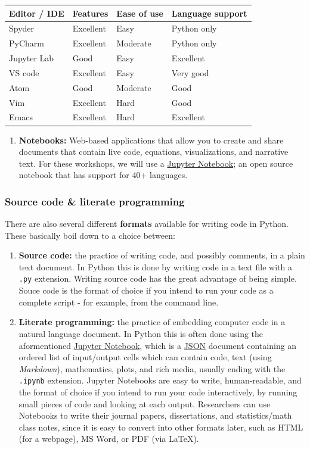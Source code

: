 \documentclass[]{book}
\providecommand{\tightlist}{%
  \setlength{\itemsep}{0pt}\setlength{\parskip}{0pt}}
\begin{document}
\begin{longtable}[]{@{}llll@{}}
\toprule
Editor / IDE & Features & Ease of use & Language support\tabularnewline
\midrule
\endhead
Spyder & Excellent & Easy & Python only\tabularnewline
PyCharm & Excellent & Moderate & Python only\tabularnewline
Jupyter Lab & Good & Easy & Excellent\tabularnewline
VS code & Excellent & Easy & Very good\tabularnewline
Atom & Good & Moderate & Good\tabularnewline
Vim & Excellent & Hard & Good\tabularnewline
Emacs & Excellent & Hard & Excellent\tabularnewline
\bottomrule
\end{longtable}

\begin{enumerate}
\def\labelenumi{\arabic{enumi}.}
\setcounter{enumi}{1}
\tightlist
\item
  \textbf{Notebooks:} Web-based applications that allow you to create and share documents that contain live code, equations, visualizations, and narrative text. For these workshops, we will use a \href{https://jupyter.org/}{Jupyter Notebook}; an open source notebook that has support for 40+ languages.
\end{enumerate}

\hypertarget{source-code-literate-programming-1}{%
\subsubsection{Source code \& literate programming}\label{source-code-literate-programming-1}}

There are also several different \textbf{formats} available for writing code in Python.
These basically boil down to a choice between:

\begin{enumerate}
\def\labelenumi{\arabic{enumi}.}
\item
  \textbf{Source code:} the practice of writing code, and possibly comments, in a plain text document. In Python this is done by writing code in a text file with a \texttt{.py} extension. Writing source code has the great advantage of being simple. Souce code is the format of choice if you intend to run your code as a complete script - for example, from the command line.
\item
  \textbf{Literate programming:} the practice of embedding computer code in a natural language document. In Python this is often done using the aformentioned \href{https://jupyter.org/}{Jupyter Notebook}, which is a \href{https://www.json.org/json-en.html}{JSON} document containing an ordered list of input/output cells which can contain code, text (using \emph{Markdown}), mathematics, plots, and rich media, usually ending with the \texttt{.ipynb} extension. Jupyter Notebooks are easy to write, human-readable, and the format of choice if you intend to run your code interactively, by running small pieces of code and looking at each output. Researchers can use Notebooks to write their journal papers, dissertations, and statistics/math class notes, since it is easy to convert into other formats later, such as HTML (for a webpage), MS Word, or PDF (via LaTeX).
\end{enumerate}
\end{document}

